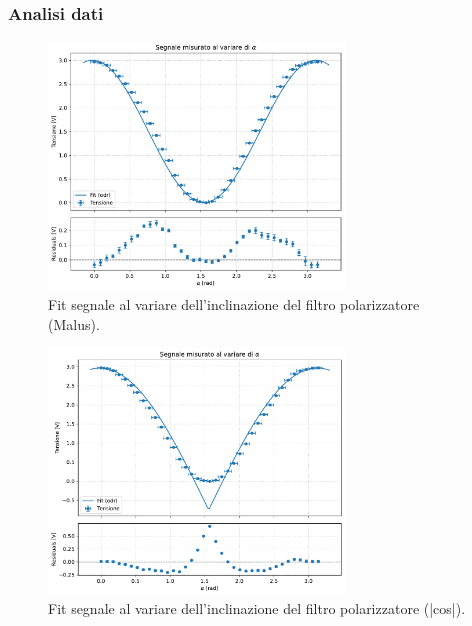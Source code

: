 \documentclass[a4paper]{article}
\begin{document}
\subsubsection{Analisi dati}
\begin{figure}[htbp]
	\centering
	\includegraphics[width=0.7\textwidth]{grafici/Malus.pdf}
	\caption{Fit segnale al variare dell'inclinazione del filtro polarizzatore (Malus).}
	\label{fig:Malus_grafico}
\end{figure}

\begin{figure}[htbp]
	\centering
	\includegraphics[width=0.7\textwidth]{grafici/abs_cos.pdf}
	\caption{Fit segnale al variare dell'inclinazione del filtro polarizzatore (|cos|).}
	\label{fig:modulo_coseno}
\end{figure}
\end{document}
